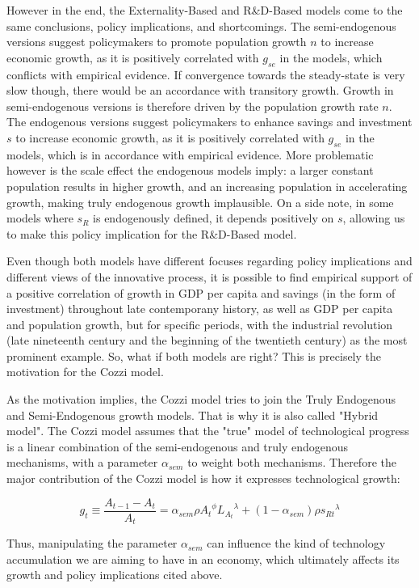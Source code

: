 \documentclass[11pt]{article} %
\begin{document}
\par However in the end, the Externality-Based and R\&D-Based models come to the same conclusions, policy implications, and shortcomings. The semi-endogenous versions suggest policymakers to promote population growth $n$ to increase economic growth, as it is positively correlated with $g_{se}$ in the models, which conflicts with empirical evidence. If convergence towards the steady-state is very slow though, there would be an accordance with transitory growth. Growth in semi-endogenous versions is therefore driven by the population growth rate $n$. The endogenous versions suggest policymakers to enhance savings and investment $s$ to increase economic growth, as it is positively correlated with $g_{se}$ in the models, which is in accordance with empirical evidence. More problematic however is the scale effect the endogenous models imply: a larger constant population results in higher growth, and an increasing population in accelerating growth, making truly endogenous growth implausible. On a side note, in some models where $s_R$ is endogenously defined, it depends positively on $s$, allowing us to make this policy implication for the R\&D-Based model.

\par Even though both models have different focuses regarding policy implications and different views of the innovative process, it is possible to find empirical support of a positive correlation of growth in GDP per capita and savings (in the form of investment) throughout late contemporany history, as well as GDP per capita and population growth, but for specific periods, with the industrial revolution (late nineteenth century and the beginning of the twentieth century) as the most prominent example. So, what if both models are right? This is precisely the motivation for the Cozzi model.

\par As the motivation implies, the Cozzi model tries to join the Truly Endogenous and Semi-Endogenous growth models. That is why it is also called "Hybrid model". The Cozzi model assumes that the "true" model of technological progress is a linear combination of the semi-endogenous and truly endogenous mechanisms, with a parameter $\alpha_{sem}$ to weight both mechanisms. Therefore the major contribution of the Cozzi model is how it expresses technological growth:

\begin{equation}
    g_t \equiv \frac{A_{t-1}-A_t}{A_t} = \alpha_{sem}\rho{A_t}^{\phi}{L_{A_{t}}}^{\lambda} + (1-\alpha_{sem})\rho{s_{Rt}}^{\lambda}
\end{equation}

\par Thus, manipulating the parameter $\alpha_{sem}$ can influence the kind of technology accumulation we are aiming to have in an economy, which ultimately affects its growth and policy implications cited above.
\end{document}
